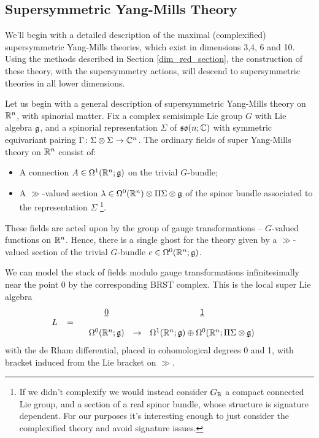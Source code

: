 \documentclass[10pt, oneside]{article}
\begin{document}
\subsection{Supersymmetric Yang-Mills Theory}
We'll begin with a detailed description of the maximal (complexified) supersymmetric Yang-Mills theories, which exist in dimensions 3,4, 6 and 10.  Using the methods described in Section \ref{dim_red_section}, the construction of these theory, with the supersymmetry actions, will descend to supersymmetric theories in all lower dimensions.  

Let us begin with a general description of supersymmetric Yang-Mills theory on $\mathbb R^n$, with spinorial matter.  Fix a complex semisimple Lie group $G$ with Lie algebra $\mathfrak g$, and a spinorial representation $\Sigma$ of $\mathfrak{so}(n;\mathbb C)$ with symmetric equivariant pairing $\Gamma \colon \Sigma \otimes \Sigma \to \mathbb C^n$.  The ordinary fields of super Yang-Mills theory on $\mathbb R^{n}$ consist of:
\begin{itemize}
\item A connection $A \in \Omega^1(\mathbb R^{n} ; \mathfrak g)$ on the trivial $G$-bundle;
\item A $\gg$-valued section $\lambda \in \Omega^0(\mathbb R^{n}) \otimes \Pi \Sigma \otimes \mathfrak g$ of the spinor bundle associated to the representation $\Sigma$
\footnote{If we didn't complexify we would instead consider $G_\mathbb R$ a compact connected Lie group, and a section of a real spinor bundle, whose structure is signature dependent.  For our purposes it's interesting enough to just consider the complexified theory and avoid signature issues.}.  
\end{itemize}
These fields are acted upon by the group of gauge transformations -- $G$-valued functions on $\mathbb R^{n}$. 
Hence, there is a single ghost for the theory given by a $\gg$-valued section of the trivial $G$-bundle $c \in \Omega^0(\mathbb R^{n} ; \mathfrak g)$. 

We can model the stack of fields modulo gauge transformations infinitesimally near the point $0$ by the corresponding BRST complex.  This is the local super Lie algebra
\[
L \;\;\; = \begin{array}{ccccc}
& \underline{0} & & \underline{1} & \\ 
& & & & \\
& \Omega^0(\mathbb R^{n}; \mathfrak{g}) & \to & \Omega^1(\mathbb R^{n}; \mathfrak{g}) \oplus \Omega^0(\mathbb R^{n}; \Pi \Sigma \otimes \mathfrak{g}) & 
\end{array}
\]
with the de Rham differential, placed in cohomological degrees 0 and 1, with bracket induced from the Lie bracket on $\gg$.
\end{document}
